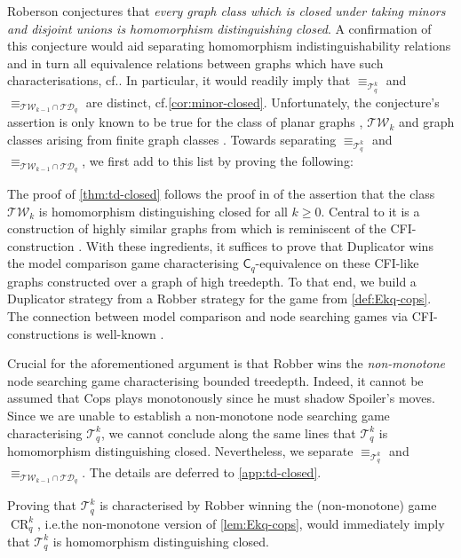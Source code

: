 \documentclass[a4paper,UKenglish,cleveref, autoref, thm-restate]{lipics-v2021}
\newcommand{\Ekq}{\ensuremath{\mathcal{T}_{q}^{k}}}
\DeclareMathOperator{\CR}{CR}
\begin{document}
Roberson conjectures that \emph{every graph class which is closed under taking minors and disjoint unions is homomorphism distinguishing closed}. A confirmation of this conjecture would aid separating homomorphism indistinguishability relations and in turn all equivalence relations between graphs which have such characterisations, cf.\@ \cite{roberson_lasserre_2023}. 
In particular, it would readily imply that $\equiv_{\Ekq}$ and $\equiv_{\mathcal{TW}_{k-1} \cap \mathcal{TD}_q}$ are distinct, cf.\@ \cref{cor:minor-closed}.
Unfortunately, the conjecture's assertion is only known to be true for the class of planar graphs \cite{roberson_oddomorphisms_2022}, $\mathcal{TW}_k$ \cite{neuen_homomorphism-distinguishing_2023} and graph classes arising from finite graph classes \cite{seppelt_logical_2023}.
Towards separating $\equiv_{\Ekq}$ and $\equiv_{\mathcal{TW}_{k-1} \cap \mathcal{TD}_q}$, we first add to this list by proving the following:

\tdclosed*

The proof of \cref{thm:td-closed} follows the proof in \cite{neuen_homomorphism-distinguishing_2023} of the assertion that the class $\mathcal{TW}_{k}$ is homomorphism distinguishing closed for all $k \geq 0$.
Central to it is a construction of highly similar graphs from \cite{roberson_oddomorphisms_2022} which is reminiscent of the CFI-construction \cite{cai_optimal_1992}. 
With these ingredients, it suffices to prove that Duplicator wins the model comparison game characterising $\mathsf{C}_q$-equivalence on these CFI-like graphs constructed over a graph of high treedepth. To that end, we build a Duplicator strategy from a Robber strategy for the game from \cref{def:Ekq-cops}.
The connection between model comparison and node searching games via CFI-constructions is well-known \cite{hella_logical_1996,dawar_power_2007}.


Crucial for the aforementioned argument is that Robber wins the \emph{non-monotone} node searching game characterising bounded treedepth. Indeed, it cannot be assumed that Cops plays monotonously since he must shadow Spoiler's moves. Since we are unable to establish a non-monotone node searching game characterising $\Ekq$, we cannot conclude along the same lines that $\Ekq$ is homomorphism distinguishing closed. Nevertheless, we separate $\equiv_{\Ekq}$ and $\equiv_{\mathcal{TW}_{k-1} \cap \mathcal{TD}_q}$.
The details are deferred to \cref{app:td-closed}.
\ekqtwtdsemantics*

Proving that $\Ekq$ is characterised by Robber winning the (non-monotone) game $\CR_q^k$, i.e.\@ the non-monotone version of \cref{lem:Ekq-cops}, would immediately imply that $\Ekq$ is homomorphism distinguishing closed. 
\end{document}
